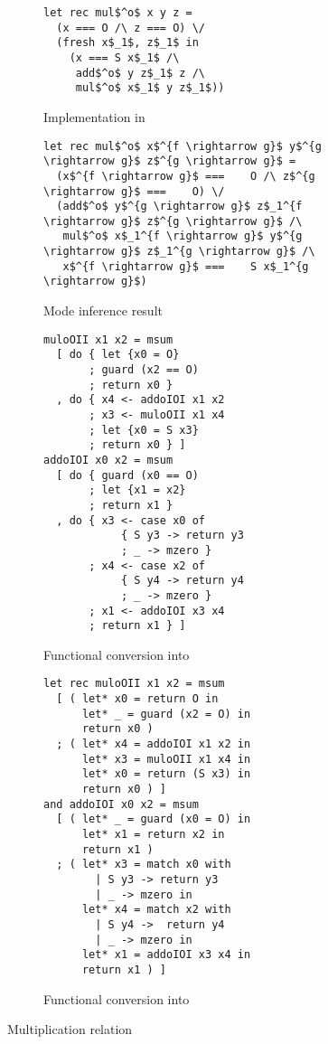 \begin{figure*}[t]
  \centering
  \begin{subfigure}[b]{0.45\textwidth}
    \begin{lstlisting}[frame=tb]
let rec mul$^o$ x y z =
  (x === O /\ z === O) \/
  (fresh x$_1$, z$_1$ in
    (x === S x$_1$ /\
     add$^o$ y z$_1$ z /\
     mul$^o$ x$_1$ y z$_1$))
    \end{lstlisting}
    \caption{Implementation in \mk}
    \label{fig:mult_mk}
  \end{subfigure}
  \hfill
  \begin{subfigure}[b]{0.45\textwidth}
    \begin{lstlisting}[frame=tb]
let rec mul$^o$ x$^{f \rightarrow g}$ y$^{g \rightarrow g}$ z$^{g \rightarrow g}$ =
  (x$^{f \rightarrow g}$ ===    O /\ z$^{g \rightarrow g}$ ===    O) \/
  (add$^o$ y$^{g \rightarrow g}$ z$_1^{f \rightarrow g}$ z$^{g \rightarrow g}$ /\
   mul$^o$ x$_1^{f \rightarrow g}$ y$^{g \rightarrow g}$ z$_1^{g \rightarrow g}$ /\
   x$^{f \rightarrow g}$ ===    S x$_1^{g \rightarrow g}$)
    \end{lstlisting}
    \caption{Mode inference result}
    \label{fig:mult_modded}
  \end{subfigure}

  \hfill

  \begin{subfigure}[b]{0.45\textwidth}
    \begin{lstlisting}[frame=tb]
muloOII x1 x2 = msum
  [ do { let {x0 = O}
       ; guard (x2 == O)
       ; return x0 }
  , do { x4 <- addoIOI x1 x2
       ; x3 <- muloOII x1 x4
       ; let {x0 = S x3}
       ; return x0 } ]
addoIOI x0 x2 = msum
  [ do { guard (x0 == O)
       ; let {x1 = x2}
       ; return x1 }
  , do { x3 <- case x0 of
            { S y3 -> return y3
            ; _ -> mzero }
       ; x4 <- case x2 of
            { S y4 -> return y4
            ; _ -> mzero }
       ; x1 <- addoIOI x3 x4
       ; return x1 } ]
    \end{lstlisting}
    \caption{Functional conversion into \haskell}
    \label{fig:mult_haskell}
  \end{subfigure}
  \hfill
  \begin{subfigure}[b]{0.45\textwidth}
    \begin{lstlisting}[frame=tb]
let rec muloOII x1 x2 = msum
  [ ( let* x0 = return O in
      let* _ = guard (x2 = O) in
      return x0 )
  ; ( let* x4 = addoIOI x1 x2 in
      let* x3 = muloOII x1 x4 in
      let* x0 = return (S x3) in
      return x0 ) ]
and addoIOI x0 x2 = msum
  [ ( let* _ = guard (x0 = O) in
      let* x1 = return x2 in
      return x1 )
  ; ( let* x3 = match x0 with
        | S y3 -> return y3
        | _ -> mzero in
      let* x4 = match x2 with
        | S y4 ->  return y4
        | _ -> mzero in
      let* x1 = addoIOI x3 x4 in
      return x1 ) ]
    \end{lstlisting}
    \caption{Functional conversion into \ocaml}
    \label{fig:mult_ocaml}
  \end{subfigure}

  \caption{Multiplication relation}
  \label{fig:mult}
\end{figure*}
